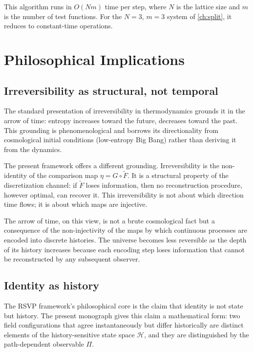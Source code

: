 \documentclass[12pt, oneside]{memoir}
\newcommand{\Hcal}{\mathcal{H}}
\newcommand{\Ft}{\widetilde{F}}
\begin{document}
This algorithm runs in $O(Nm)$ time per step, where $N$ is the lattice size and $m$ is
the number of test functions.  For the $N=3$, $m=3$ system of \cref{ch:split}, it reduces
to constant-time operations.

\chapter{Philosophical Implications}
\label{ch:philosophy}

\section{Irreversibility as structural, not temporal}

The standard presentation of irreversibility in thermodynamics grounds it in the arrow
of time: entropy increases toward the future, decreases toward the past.  This grounding
is phenomenological and borrows its directionality from cosmological initial conditions
(low-entropy Big Bang) rather than deriving it from the dynamics.

The present framework offers a different grounding.  Irreversibility is the non-identity
of the comparison map $\eta = G \circ \Ft$.  It is a structural property of the
discretization channel: if $\Ft$ loses information, then no reconstruction procedure,
however optimal, can recover it.  This irreversibility is not about which direction time
flows; it is about which maps are injective.

The arrow of time, on this view, is not a brute cosmological fact but a consequence of
the non-injectivity of the maps by which continuous processes are encoded into discrete
histories.  The universe becomes less reversible as the depth of its history increases
because each encoding step loses information that cannot be reconstructed by any
subsequent observer.

\section{Identity as history}

The RSVP framework's philosophical core is the claim that identity is not state but
history.  The present monograph gives this claim a mathematical form: two field
configurations that agree instantaneously but differ historically are distinct elements of
the history-sensitive state space $\Hcal$, and they are distinguished by the
path-dependent observable $\Pi$.
\end{document}
